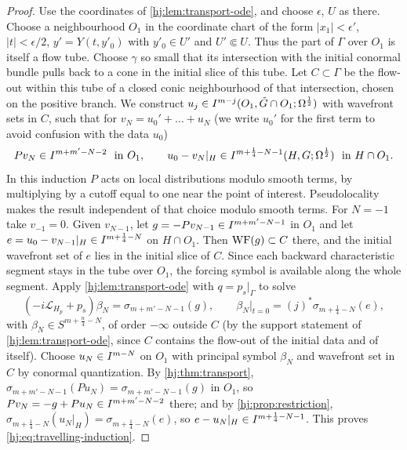 \begin{proof}
  Use the coordinates of \cref{hj:lem:transport-ode}, and choose $\epsilon$, $U$
  as there. Choose a neighbourhood $O_1$ in the coordinate chart of the form
  $|x_1|<\epsilon'$, $|t|<\epsilon/2$, $y'=Y(t,y'_0)$ with $y'_0\in U'$
  and $U'\Subset U$. Thus the part of $\Gamma$ over $O_1$ is itself a flow tube.
  Choose $\gamma$ so small that its intersection with the initial conormal
  bundle pulls back to a cone in the initial slice of this tube. Let
  $C\subset\Gamma$ be the flow-out within this tube of a closed conic
  neighbourhood of that intersection, chosen on the positive branch.
  We construct $u_j\in I^{m-j}(O_1,\tilde G\cap O_1;\Omega^{\frac12})$ with wavefront
  sets in $C$, such that for
  $v_N=u_0'+\dots+u_N$ (we write $u_0'$ for the first term to avoid confusion with
  the data $u_0$)
  \begin{equation}\label{hj:eq:travelling-induction}
    Pv_N\in I^{m+m'-N-2}\ \text{ in }O_1,\qquad u_0-v_N|_H\in
    I^{m+\frac14-N-1}(H,G;\Omega^{\frac12})\ \text{ in } H\cap O_1.
  \end{equation}
  In this induction $P$ acts on local distributions modulo smooth terms,
  by multiplying by a cutoff equal to one near the point of interest.
  Pseudolocality makes the result independent of that choice modulo smooth
  terms. For $N=-1$ take $v_{-1}=0$. Given $v_{N-1}$, let
  $g=-Pv_{N-1}\in I^{m+m'-N-1}$ in $O_1$ and let
  $e=u_0-v_{N-1}|_H\in I^{m+\frac14-N}$ on $H\cap O_1$. Then
  $\operatorname{WF}(g)\subset C$ there, and the initial wavefront set of $e$ lies in
  the initial slice of $C$. Since each backward characteristic segment
  stays in the tube over $O_1$, the forcing symbol is available along the
  whole segment. Apply \cref{hj:lem:transport-ode} with $q=p_s|_\Gamma$ to solve
  \begin{equation*}
    (-i\mathcal L_{H_p}+p_s)\beta_N=\sigma_{m+m'-N-1}(g),\qquad
    \beta_N|_{t=0}=(j)^*\sigma_{m+\frac14-N}(e),
  \end{equation*}
  with $\beta_N\in S^{m+\frac n4-N}$, of order $-\infty$ outside $C$ (by the support
  statement of \cref{hj:lem:transport-ode}, since $C$ contains the flow-out of
  the initial data and of itself). Choose $u_N\in I^{m-N}$ on $O_1$ with
  principal symbol $\beta_N$ and wavefront set in $C$ by conormal
  quantization. By \cref{hj:thm:transport},
  $\sigma_{m+m'-N-1}(Pu_N)=\sigma_{m+m'-N-1}(g)$ in $O_1$, so
  $Pv_N=-g+Pu_N\in I^{m+m'-N-2}$ there; and by \cref{hj:prop:restriction},
  $\sigma_{m+\frac14-N}(u_N|_H)=\sigma_{m+\frac14-N}(e)$, so $e-u_N|_H\in
  I^{m+\frac14-N-1}$.  This proves \eqref{hj:eq:travelling-induction}.


\end{proof}
